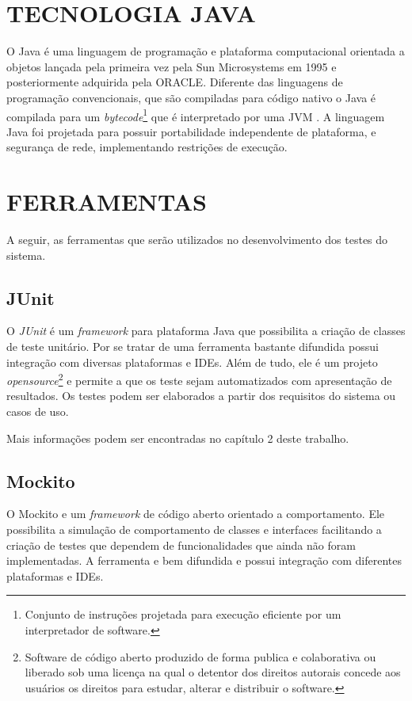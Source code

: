 \section{TECNOLOGIA JAVA}

O Java é uma linguagem de programação e plataforma computacional orientada a objetos lançada pela primeira vez pela Sun Microsystems em 1995 e posteriormente adquirida pela ORACLE. Diferente das linguagens de programação convencionais, que são compiladas para código nativo o Java é compilada para um \textit{bytecode}\footnote{Conjunto de instruções projetada para execução eficiente por um interpretador de software. } que é interpretado por uma JVM \cite{Java}. A linguagem Java foi projetada para possuir portabilidade independente de plataforma, e segurança de rede, implementando restrições de execução.

\section{FERRAMENTAS}

A seguir, as ferramentas que serão utilizados no desenvolvimento dos
testes do sistema.

\subsection{JUnit}

O  \textit{JUnit} é um \textit{framework} para plataforma Java que possibilita a criação de classes de teste unitário. Por se tratar de uma ferramenta bastante difundida possui integração com diversas plataformas e IDEs. Além de tudo, ele é um projeto \textit{opensource}\footnote{Software de código aberto produzido de forma publica e colaborativa ou liberado sob uma licença na qual o detentor dos direitos autorais concede aos usuários os direitos para estudar, alterar e distribuir o software.} e permite a que os teste sejam automatizados com apresentação de resultados. Os testes podem ser elaborados a partir dos requisitos do sistema ou casos de uso. 


Mais informações podem ser encontradas no capítulo 2 deste trabalho.

\subsection{Mockito}

O Mockito e um \textit{framework} de código aberto orientado a comportamento. Ele possibilita a simulação de comportamento de classes e interfaces facilitando a criação de testes que dependem de funcionalidades que ainda não foram implementadas. A ferramenta e bem difundida e possui integração com diferentes plataformas e IDEs. 

